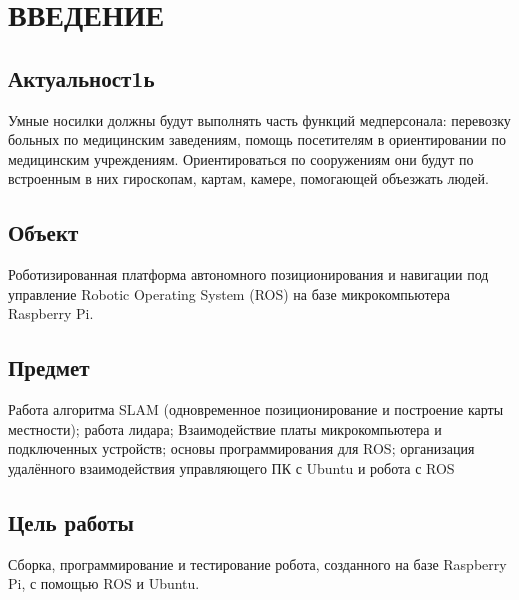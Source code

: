 \documentclass[a4paper]{article}
\begin{document}
\section{ВВЕДЕНИЕ}
\subsection[Актуальность]{Актуальност\foreignlanguage{english}{1}ь}
Умные носилки должны будут выполнять часть функций медперсонала: перевозку больных по медицинским заведениям, помощь
посетителям в ориентировании по медицинским учреждениям. Ориентироваться по сооружениям они будут по встроенным в них
гироскопам, картам, камере, помогающей объезжать людей.

\subsection{Объект}
Роботизированная платформа автономного позиционирования и навигации под управление \foreignlanguage{english}{Robotic}
\foreignlanguage{english}{Operating} \foreignlanguage{english}{System} (\foreignlanguage{english}{ROS}) на базе
микрокомпьютера Raspberry \foreignlanguage{english}{Pi}.

\subsection{Предмет}
Работа алгоритма \foreignlanguage{english}{SLAM} (одновременное позиционирование и построение карты местности); работа
лидара; Взаимодействие платы микрокомпьютера и подключенных устройств; основы программирования для
\foreignlanguage{english}{ROS}; организация удалённого взаимодействия управляющего ПК с Ubuntu и робота с
\foreignlanguage{english}{ROS}

\subsection{Цель работы}
Сборка, программирование и тестирование робота, созданного на базе Raspberry Pi, с помощью
\foreignlanguage{english}{ROS} и Ubuntu.
\end{document}
